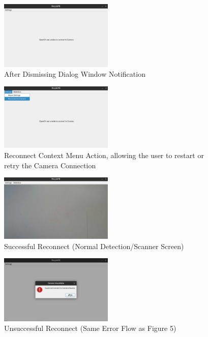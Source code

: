 \documentclass[conference]{IEEEtran}
\begin{document}
\begin{figure}[h]
    \centering
    \includegraphics[width=0.48\textwidth]{images/camera_source_error_2.eps}
    \caption{After Dismissing Dialog Window Notification}
\end{figure}

\begin{figure}[h]
    \centering
    \includegraphics[width=0.48\textwidth]{images/reconnect_to_camera_context.eps}
    \caption{Reconnect Context Menu Action, allowing the user to restart or retry the Camera Connection}
\end{figure}

\begin{figure}[h]
    \centering
    \includegraphics[width=0.48\textwidth]{images/nothing_detected.eps}
    \caption{Successful Reconnect (Normal Detection/Scanner Screen)}
\end{figure}

\begin{figure}[h]
    \centering
    \includegraphics[width=0.48\textwidth]{images/camera_source_error.eps}
    \caption{Unsuccessful Reconnect (Same Error Flow as Figure 5)}
\end{figure}~\\
\end{document}
